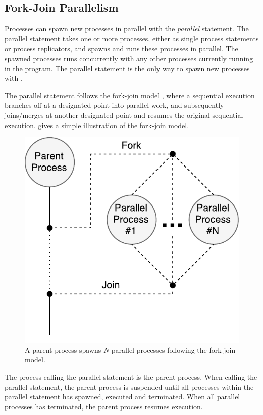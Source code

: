 \subsection{Fork\hyp{}Join Parallelism}
\label{subsec:fork_join_parallelism}


Processes can spawn new processes in parallel with the \textit{parallel} statement. The parallel statement takes one or more processes, either as single process statements or process replicators, and spawns and runs these processes in parallel. The spawned processes runs concurrently with any other processes currently running in the program. The parallel statement is the only way to spawn new processes with \Proxc{}.

The parallel statement follows the fork\hyp{}join model \citep[page 88]{mccool2012structured}, where a sequential execution branches off at a designated point into parallel work, and subsequently joins/merges at another designated point and resumes the original sequential execution.  gives a simple illustration of the fork\hyp{}join model.

\begin{figure}[h!]
    \centering
    \includegraphics[width=0.6\linewidth]{fig/fork_join}
    \caption{A parent process spawns $N$ parallel processes following the fork\hyp{}join model.}
    \label{fig:fork_join_model}
\end{figure}

The process calling the parallel statement is the parent process. When calling the parallel statement, the parent process is suspended until all processes within the parallel statement has spawned, executed and terminated. When all parallel processes has terminated, the parent process resumes execution. 

